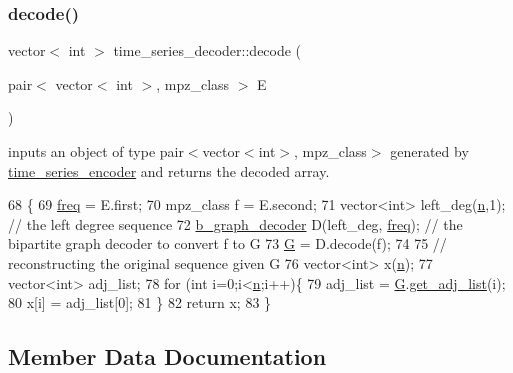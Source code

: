 \subsubsection{\texorpdfstring{decode()}{decode()}}
{\footnotesize\ttfamily vector$<$ int $>$ time\+\_\+series\+\_\+decoder\+::decode (\begin{DoxyParamCaption}\item[{pair$<$ vector$<$ int $>$, mpz\+\_\+class $>$}]{E }\end{DoxyParamCaption})}



inputs an object of type {\ttfamily pair$<$vector$<$int$>$, mpz\+\_\+class$>$} generated by {\ttfamily \hyperlink{classtime__series__encoder}{time\+\_\+series\+\_\+encoder}} and returns the decoded array. 


\begin{DoxyCode}
68 \{
69   \hyperlink{classtime__series__decoder_a25875d5879e79eeda27588b9cbcad591}{freq} = E.first;
70   mpz\_class f = E.second;
71   vector<int> left\_deg(\hyperlink{classtime__series__decoder_a05f75c42ac2acd63766714e6e09f1a65}{n},1); \textcolor{comment}{// the left degree sequence}
72   \hyperlink{classb__graph__decoder}{b\_graph\_decoder} D(left\_deg, \hyperlink{classtime__series__decoder_a25875d5879e79eeda27588b9cbcad591}{freq}); \textcolor{comment}{// the bipartite graph decoder to convert f to G}
73   \hyperlink{classtime__series__decoder_a66abe50babd1ebe2eb5a130d4b8091f1}{G} = D.decode(f);
74 
75   \textcolor{comment}{// reconstructing the original sequence given G}
76   vector<int> x(\hyperlink{classtime__series__decoder_a05f75c42ac2acd63766714e6e09f1a65}{n});
77   vector<int> adj\_list;
78   \textcolor{keywordflow}{for} (\textcolor{keywordtype}{int} i=0;i<\hyperlink{classtime__series__decoder_a05f75c42ac2acd63766714e6e09f1a65}{n};i++)\{
79     adj\_list = \hyperlink{classtime__series__decoder_a66abe50babd1ebe2eb5a130d4b8091f1}{G}.\hyperlink{classb__graph_aa81c7179b9c6cb4986c4b41e84a85799}{get\_adj\_list}(i);
80     x[i] = adj\_list[0];
81   \}
82   \textcolor{keywordflow}{return} x;
83 \}
\end{DoxyCode}


\subsection{Member Data Documentation}
\mbox{\label{classtime__series__decoder_a9e712b2d41cc124485c4d6f497504c29}} 

